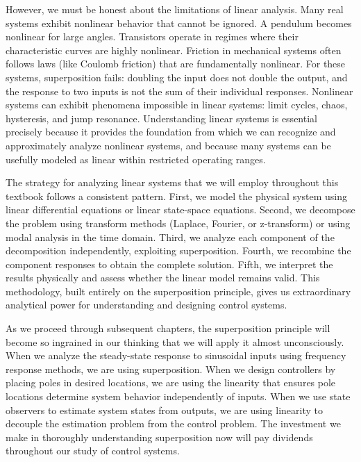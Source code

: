 However, we must be honest about the limitations of linear analysis. Many real systems exhibit nonlinear behavior that cannot be ignored. A pendulum becomes nonlinear for large angles. Transistors operate in regimes where their characteristic curves are highly nonlinear. Friction in mechanical systems often follows laws (like Coulomb friction) that are fundamentally nonlinear. For these systems, superposition fails: doubling the input does not double the output, and the response to two inputs is not the sum of their individual responses. Nonlinear systems can exhibit phenomena impossible in linear systems: limit cycles, chaos, hysteresis, and jump resonance. Understanding linear systems is essential precisely because it provides the foundation from which we can recognize and approximately analyze nonlinear systems, and because many systems can be usefully modeled as linear within restricted operating ranges.

The strategy for analyzing linear systems that we will employ throughout this textbook follows a consistent pattern. First, we model the physical system using linear differential equations or linear state-space equations. Second, we decompose the problem using transform methods (Laplace, Fourier, or z-transform) or using modal analysis in the time domain. Third, we analyze each component of the decomposition independently, exploiting superposition. Fourth, we recombine the component responses to obtain the complete solution. Fifth, we interpret the results physically and assess whether the linear model remains valid. This methodology, built entirely on the superposition principle, gives us extraordinary analytical power for understanding and designing control systems.

As we proceed through subsequent chapters, the superposition principle will become so ingrained in our thinking that we will apply it almost unconsciously. When we analyze the steady-state response to sinusoidal inputs using frequency response methods, we are using superposition. When we design controllers by placing poles in desired locations, we are using the linearity that ensures pole locations determine system behavior independently of inputs. When we use state observers to estimate system states from outputs, we are using linearity to decouple the estimation problem from the control problem. The investment we make in thoroughly understanding superposition now will pay dividends throughout our study of control systems.
